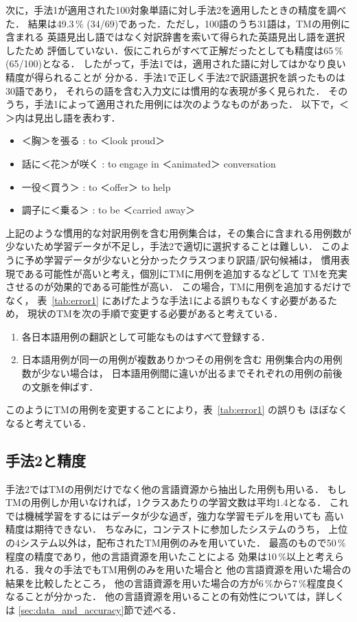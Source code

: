 次に，手法1が適用された100対象単語に対し手法2を適用したときの精度を調べた．
結果は49.3\,\% (34/69)であった．ただし，100語のうち31語は，TMの用例に含まれる
英語見出し語ではなく対訳辞書を索いて得られた英語見出し語を選択したため
評価していない．仮にこれらがすべて正解だったとしても精度は65\,\% (65/100)となる．
したがって，手法1では，適用された語に対してはかなり良い精度が得られることが
分かる．手法1で正しく手法2で訳語選択を誤ったものは30語であり，
それらの語を含む入力文には慣用的な表現が多く見られた．
そのうち，手法1によって適用された用例には次のようなものがあった．
以下で，＜＞内は見出し語を表わす．
\begin{itemize}
\item ＜胸＞を張る : to ＜look proud＞
\item 話に＜花＞が咲く : to engage in ＜animated＞ conversation
\item 一役＜買う＞ : to ＜offer＞ to help
\item 調子に＜乗る＞ : to be ＜carried away＞
\end{itemize}
上記のような慣用的な対訳用例を含む用例集合は，その集合に含まれる用例数が
少ないため学習データが不足し，手法2で適切に選択することは難しい．
このように予め学習データが少ないと分かったクラスつまり訳語/訳句候補は，
慣用表現である可能性が高いと考え，個別にTMに用例を追加するなどして
TMを充実させるのが効果的である可能性が高い．
この場合，TMに用例を追加するだけでなく，
表~\ref{tab:error1} にあげたような手法1による誤りもなくす必要があるため，
現状のTMを次の手順で変更する必要があると考えている．
\begin{enumerate}
\item 各日本語用例の翻訳として可能なものはすべて登録する．
\item 日本語用例が同一の用例が複数ありかつその用例を含む
  用例集合内の用例数が少ない場合は，
  日本語用例間に違いが出るまでそれぞれの用例の前後の文脈を伸ばす．
\end{enumerate}
このようにTMの用例を変更することにより，表~\ref{tab:error1} の誤りも
ほぼなくなると考えている．

\subsection{手法2と精度}
\label{sec:method2_and_acc}

手法2ではTMの用例だけでなく他の言語資源から抽出した用例も用いる．
もしTMの用例しか用いなければ，1クラスあたりの学習文数は平均1.4となる．
これでは機械学習をするにはデータが少な過ぎ，強力な学習モデルを用いても
高い精度は期待できない．
ちなみに，コンテストに参加したシステムのうち，
上位の4システム以外は，配布されたTM用例のみを用いていた．
最高のもので50\,\%程度の精度であり，他の言語資源を用いたことによる
効果は10\,\%以上と考えられる．我々の手法でもTM用例のみを用いた場合と
他の言語資源を用いた場合の結果を比較したところ，
他の言語資源を用いた場合の方が6\,\%から7\,\%程度良くなることが分かった．
他の言語資源を用いることの有効性については，詳しくは
\ref{sec:data_and_accuracy}節で述べる．

